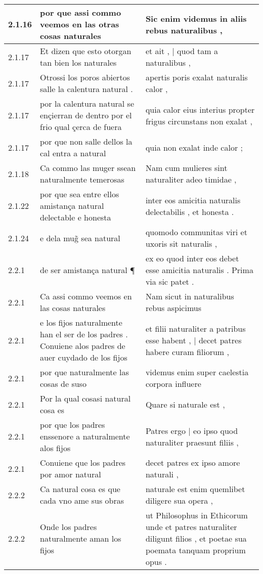 \begin{tabular}{|p{1cm}|p{6.5cm}|p{6.5cm}|}
2.1.16 & por que assi commo veemos en las otras cosas naturales & Sic enim videmus in aliis rebus naturalibus , \\\hline
2.1.17 & Et dizen que esto otorgan tan bien los naturales & et ait , | quod tam a naturalibus , \\\hline
2.1.17 & Otrossi los poros abiertos salle la calentura natural . & apertis poris exalat naturalis calor , \\\hline
2.1.17 & por la calentura natural se ençierran de dentro por el frio qual çerca de fuera & quia calor eius interius propter frigus circunstans non exalat , \\\hline
2.1.17 & por que non salle dellos la cal entra a natural & quia non exalat inde calor ; \\\hline
2.1.18 & Ca commo las muger ssean naturalmente temerosas & Nam cum mulieres sint naturaliter adeo timidae , \\\hline
2.1.22 & por que sea entre ellos amistança natural delectable e honesta & inter eos amicitia naturalis delectabilis , et honesta . \\\hline
2.1.24 & e dela mug̃ sea natural & quomodo communitas viri et uxoris sit naturalis , \\\hline
2.2.1 & de ser amistança natural ¶ & ex eo quod inter eos debet esse amicitia naturalis . Prima via sic patet . \\\hline
2.2.1 & Ca assi commo veemos en las cosas naturales & Nam sicut in naturalibus rebus aspicimus \\\hline
2.2.1 & e los fijos naturalmente han el ser de los padres . Conuiene alos padres de auer cuydado de los fijos & et filii naturaliter a patribus esse habent , | decet patres habere curam filiorum , \\\hline
2.2.1 & por que naturalmente las cosas de suso & videmus enim super caelestia corpora influere \\\hline
2.2.1 & Por la qual cosasi natural cosa es & Quare si naturale est , \\\hline
2.2.1 & por que los padres enssenore a naturalmente alos fijos & Patres ergo | eo ipso quod naturaliter praesunt filiis , \\\hline
2.2.1 & Conuiene que los padres por amor natural & decet patres ex ipso amore naturali , \\\hline
2.2.2 & Ca natural cosa es que cada vno ame sus obras & naturale est enim quemlibet diligere sua opera , \\\hline
2.2.2 & Onde los padres naturalmente aman los fijos & ut Philosophus in Ethicorum unde et patres naturaliter diligunt filios , et poetae sua poemata tanquam proprium opus . \\\hline

\end{tabular}
